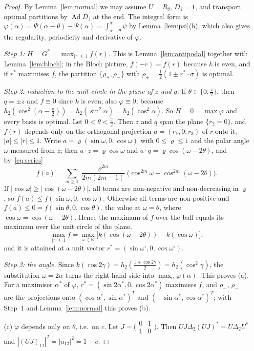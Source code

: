 \documentclass[11pt]{article}
\DeclareMathOperator{\Ad}{Ad}
\newcommand{\R}{\mathbb{R}}
\theoremstyle{plain}
\theoremstyle{definition}
\theoremstyle{remark}
\begin{document}
\begin{proof}
By Lemma~\ref{lem:normal} we may assume $U=R_\theta$, $D_1=1$, and transport optimal partitions by $\Ad D_1$ at the end.
The integral form is $\varphi(\alpha)=\Psi(\alpha-\theta)-\Psi(\alpha)=\int_{\alpha-\theta}^\alpha\psi$ by Lemma~\ref{lem:psi}(b), which
also gives the regularity, periodicity and derivative of $\varphi$.

\emph{Step 1: $H=G^*=\max_{|r|\le1}f(r)$.} This is Lemma~\ref{lem:antipodal} together with Lemma~\ref{lem:bloch}; in the Bloch
picture, $f(-r)=f(r)$ because $k$ is even, and if $r^*$ maximises $f$, the partition $\{\rho_+,\rho_-\}$ with
$\rho_\pm=\frac12(1\pm r^*\cdot\sigma)$ is optimal.

\emph{Step 2: reduction to the unit circle in the plane of $z$ and $q$.} If $\theta\in\{0,\frac\pi2\}$, then $q=\pm z$ and $f\equiv0$
since $k$ is even; also $\varphi\equiv0$, because $h_2(\cos^2(\alpha-\frac\pi2))=h_2(\sin^2\alpha)=h_2(\cos^2\alpha)$. So $H=0=\max\varphi$
and every basis is optimal. Let $0<\theta<\frac\pi2$. Then $z$ and $q$ span the plane $\{r_2=0\}$, and $f(r)$ depends only on
the orthogonal projection $a=(r_1,0,r_3)$ of $r$ onto it, $|a|\le|r|\le1$. Write $a=\varrho(\sin\omega,0,\cos\omega)$ with
$0\le\varrho\le1$ and the polar angle $\omega$ measured from $z$; then $a\cdot z=\varrho\cos\omega$ and
$a\cdot q=\varrho\cos(\omega-2\theta)$, and by~\eqref{eq:series}
\[
  f(a)=\sum_{m\ge1}\frac{\varrho^{2m}}{2m(2m-1)}\bigl(\cos^{2m}\omega-\cos^{2m}(\omega-2\theta)\bigr).
\]
If $|\cos\omega|\ge|\cos(\omega-2\theta)|$, all terms are non-negative and non-decreasing in $\varrho$, so
$f(a)\le f(\sin\omega,0,\cos\omega)$. Otherwise all terms are non-positive and $f(a)\le0=f(\sin\theta,0,\cos\theta)$, the
value at $\omega=\theta$, where $\cos\omega=\cos(\omega-2\theta)$. Hence the maximum of $f$ over the ball equals its maximum over
the unit circle of the plane,
\[
  \max_{|r|\le1}f=\max_{\omega\in\R}\bigl[k(\cos(\omega-2\theta))-k(\cos\omega)\bigr],
\]
and it is attained at a unit vector $r^*=(\sin\omega^\circ,0,\cos\omega^\circ)$.

\emph{Step 3: the angle.} Since $k(\cos2\gamma)=h_2(\frac{1+\cos2\gamma}2)=h_2(\cos^2\gamma)$, the substitution $\omega=2\alpha$ turns
the right-hand side into $\max_\alpha\varphi(\alpha)$. This proves (a). For a maximiser $\alpha^*$ of $\varphi$, $r^*=(\sin2\alpha^*,0,
\cos2\alpha^*)$ maximises $f$, and $\rho_+$, $\rho_-$ are the projections onto $(\cos\alpha^*,\sin\alpha^*)^T$ and
$(-\sin\alpha^*,\cos\alpha^*)^T$; with Step~1 and Lemma~\ref{lem:normal} this proves (b).

(c) $\varphi$ depends only on $\theta$, i.e.\ on $c$. Let $J=\bigl(\begin{smallmatrix}0&1\\1&0\end{smallmatrix}\bigr)$. Then
$UJ\Delta_2(UJ)^*=U\Delta_2U^*$ and $|(UJ)_{11}|^2=|u_{12}|^2=1-c$.
\end{proof}
\end{document}
